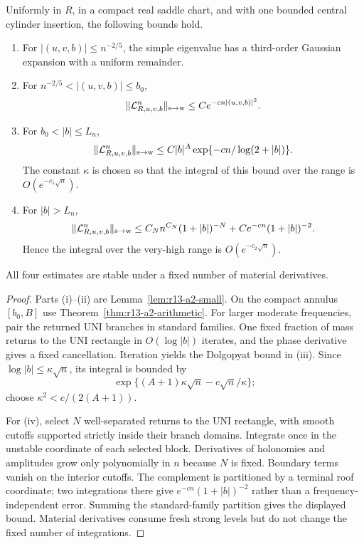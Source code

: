 \begin{theorem}
\label{thm:r13-a2-fourier}
Uniformly in $R$, in a compact real saddle chart, and with one bounded central
cylinder insertion, the following bounds hold.
\begin{enumerate}[label=(\roman*)]
\item For $|(u,v,b)|\le n^{-2/5}$, the simple eigenvalue has a third-order
      Gaussian expansion with a uniform remainder.
\item For $n^{-2/5}<|(u,v,b)|\le b_0$,
\[
 \|\mathcal L_{R,u,v,b}^n\|_{\rm s\to w}
 \le Ce^{-cn|(u,v,b)|^2}.
\]
\item For $b_0<|b|\le L_n$,
\[
 \|\mathcal L_{R,u,v,b}^n\|_{\rm s\to w}
 \le C|b|^A\exp\{-cn/\log(2+|b|)\}.
\]
The constant $\kappa$ is chosen so that the integral of this bound over the
range is $O(e^{-c_1\sqrt n})$.
\item For $|b|>L_n$,
\[
 \|\mathcal L_{R,u,v,b}^n\|_{\rm s\to w}
 \le C_N n^{C_N}(1+|b|)^{-N}
      +Ce^{-cn}(1+|b|)^{-2}.
\]
Hence the integral over the very-high range is $O(e^{-c_2\sqrt n})$.
\end{enumerate}
All four estimates are stable under a fixed number of material derivatives.
\end{theorem}

\begin{proof}
Parts (i)--(ii) are Lemma~\ref{lem:r13-a2-small}.  On the compact annulus
$[b_0,B]$ use Theorem~\ref{thm:r13-a2-arithmetic}.  For larger moderate
frequencies, pair the returned UNI branches in standard families.  One fixed
fraction of mass returns to the UNI rectangle in $O(\log|b|)$ iterates, and
the phase derivative gives a fixed cancellation.  Iteration yields the
Dolgopyat bound in (iii).  Since $\log|b|\le\kappa\sqrt n$, its integral is
bounded by
\[
 \exp\{(A+1)\kappa\sqrt n-c\sqrt n/\kappa\};
\]
choose $\kappa^2<c/(2(A+1))$.

For (iv), select $N$ well-separated returns to the UNI rectangle, with smooth
cutoffs supported strictly inside their branch domains.  Integrate once in the
unstable coordinate of each selected block.  Derivatives of holonomies and
amplitudes grow only polynomially in $n$ because $N$ is fixed.  Boundary
terms vanish on the interior cutoffs.  The complement is partitioned by a
terminal roof coordinate; two integrations there give
$e^{-cn}(1+|b|)^{-2}$ rather than a frequency-independent error.  Summing the
standard-family partition gives the displayed bound.  Material derivatives
consume fresh strong levels but do not change the fixed number of integrations.
\end{proof}


